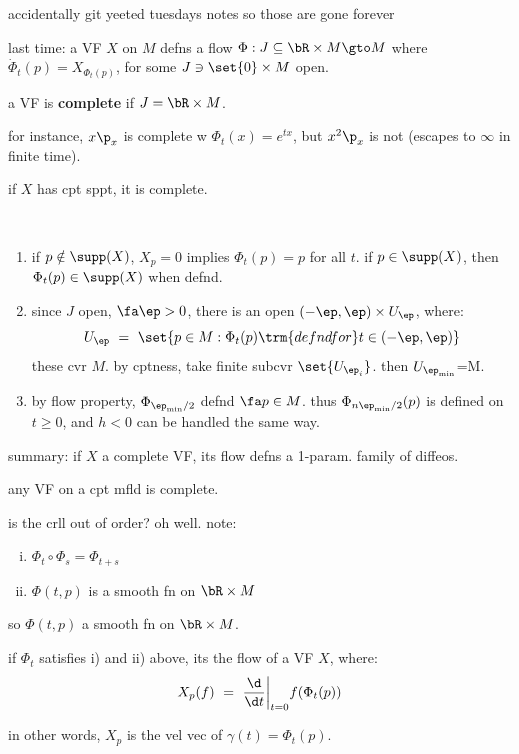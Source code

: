 accidentally git yeeted tuesdays notes so those are gone forever

last time: a VF $X$ on $M$ defns a flow $\Phi:J\subseteq\bR\times M\gto M$ where $\dot{\Phi}_{t}(p)=X_{\Phi_{t}(p)}$,
for some $J\ni\set{0}\times M$ open.

\begin{defn}
	a VF is \textbf{complete} if $J=\bR\times M$.
\end{defn}
for instance, $x\p_{x}$ is complete w $\Phi_{t}(x)=e^{tx}$, but
$x^{2}\p_{x}$ is not (escapes to $\infty$ in finite time).

\begin{thm}
	if $X$ has cpt sppt, it is complete.
\end{thm} \

\begin{pf} \vspace{-0.2in}
	\begin{enumerate}[1)]
		\item if $p\notin\supp(X)$, $X_{p}=0$ implies $\Phi_{t}(p)=p$ for all $t$.
			if $p\in\supp(X)$, then $\Phi_{t}(p)\in\supp(X)$ when defnd.
		\item since $J$ open, $\fa\ep>0$, there is an open $(-\ep,\ep)\times U_{\ep}$, where:
			\begin{equation*}
				U_{\ep} \ = \ \set{p\in M:\Phi_{t}(p) \trm{ defnd for } t \in (-\ep,\ep)}
			\end{equation*}
			these cvr $M$. by cptness, take finite subcvr $\set{U_{\ep_{i}}}$.
			then $U_{\ep_{\min}}$=M.
		\item by flow property, $\Phi_{\ep_{\min}/2}$ defnd $\fa p\in M$.
			thus $\Phi_{n\ep_{\min}/2}(p)$ is defined on $t\geq0$,
			and $h<0$ can be handled the same way.
	\end{enumerate}
\end{pf}
summary: if $X$ a complete VF, its flow defns a 1-param. family of diffeos.

\begin{crll}
	any VF on a cpt mfld is complete.
\end{crll}
is the crll out of order? oh well. note:
\begin{enumerate}[i)]
	\item $\Phi_{t}\circ\Phi_{s}=\Phi_{t+s}$
	\item $\Phi(t,p)$ is a smooth fn on $\bR\times M$
\end{enumerate}
so $\Phi(t,p)$ a smooth fn on $\bR\times M$.

\begin{prop}
	if $\Phi_{t}$ satisfies i) and ii) above, its the flow of a VF $X$, where:
	\begin{equation*}
		X_{p}(f) \ = \ \frac{\d}{\d t}\bigg\rvert_{t=0}f(\Phi_{t}(p))
	\end{equation*}
\end{prop}
in other words, $X_{p}$ is the vel vec of $\gamma(t)=\Phi_{t}(p)$.

